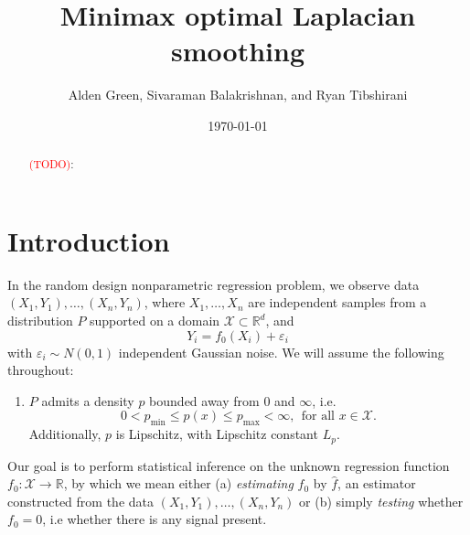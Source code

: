 \documentclass{article}
\newcommand{\Reals}{\mathbb{R}}
\newcommand{\1}{\mathbf{1}}
\newcommand{\Xset}{\mathcal{X}}
\newcommand{\wh}[1]{\widehat{#1}}
\theoremstyle{alden}
\theoremstyle{aldenthm}
\theoremstyle{definition}
\theoremstyle{remark}
\begin{document}
\title{Minimax optimal Laplacian smoothing}
\author{Alden Green, Sivaraman Balakrishnan, and Ryan Tibshirani}
\date{\today}
\maketitle

\begin{abstract}
	\textcolor{red}{(TODO)}:
\end{abstract}

\section{Introduction}

In the random design nonparametric regression problem, we observe data $(X_1,Y_1),\ldots,(X_n,Y_n)$, where $X_1,\ldots,X_n$ are independent samples from a distribution $P$ supported on a domain $\Xset \subset \Reals^d$, and 
\begin{equation}
\label{eqn:random_design_regression}
Y_i = f_0(X_i) + \varepsilon_i
\end{equation}
with $\varepsilon_i \sim N(0,1)$ independent Gaussian noise. We will assume the following throughout:
\begin{enumerate}[label=(P\arabic*)]
	\item
	\label{asmp:bounded_lipschitz_density} 
	$P$ admits a density $p$ bounded away from $0$ and $\infty$, i.e.
	\begin{equation*}
	0 < p_{\min} \leq p(x) \leq p_{\max} < \infty,~~\textrm{for all $x \in \Xset$.}
	\end{equation*}
	Additionally, $p$ is Lipschitz, with Lipschitz constant $L_p$.
\end{enumerate}
Our goal is to perform statistical inference on the unknown regression function $f_0: \Xset \to \Reals$, by which we mean either (a) \emph{estimating} $f_0$ by $\wh{f}$, an estimator constructed from the data $(X_1,Y_1),\ldots,(X_n,Y_n)$ or (b) simply \emph{testing} whether $f_0 = 0$, i.e whether there is any signal present. 
\end{document}
